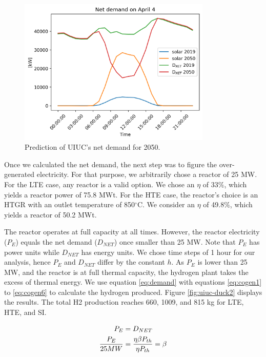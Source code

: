 \begin{figure}[htbp!]
		\centering
	\includegraphics[height=7cm]{figures-hydro/uiuc-duck}
	\hfill
	\caption{Prediction of \gls{UIUC}'s net demand for 2050.}
	\label{fig:uiuc-duck1}
\end{figure}

Once we calculated the net demand, the next step was to figure the over-generated electricity.
For that purpose, we arbitrarily chose a reactor of 25 MW.
For the \gls{LTE} case, any reactor is a valid option.
We chose an $\eta$ of 33$\%$, which yields a reactor power of 75.8 MWt.
For the \gls{HTE} case, the reactor's choice is an HTGR with an outlet temperature of 850$^{\circ}$C.
We consider an $\eta$ of 49.8$\%$, which yields a reactor of 50.2 MWt.

The reactor operates at full capacity at all times.
However, the reactor electricity ($P_{E}$) equals the net demand ($D_{NET}$) once smaller than 25 MW.
Note that $P_{E}$ has power units while $D_{NET}$ has energy units.
We chose time steps of 1 hour for our analysis, hence $P_{E}$ and $D_{NET}$ differ by the constant $h$.
As $P_{E}$ is lower than 25 MW, and the reactor is at full thermal capacity, the hydrogen plant takes the excess of thermal energy.
We use equation \ref{eq:demand} with equations \ref{eq:cogen1} to \ref{eq:cogen6} to calculate the hydrogen produced.
Figure \ref{fig:uiuc-duck2} displays the results.
The total \gls{H2} production reaches 660, 1009, and 815 kg for \gls{LTE}, \gls{HTE}, and \gls{SI}.

\begin{align}
	P_{E} &= D_{NET}  \notag \\
  \frac{P_{E}}{25 MW} &= \frac{\eta \beta P_{th}}{\eta P_{th}} = \beta  \label{eq:demand}
\end{align}

